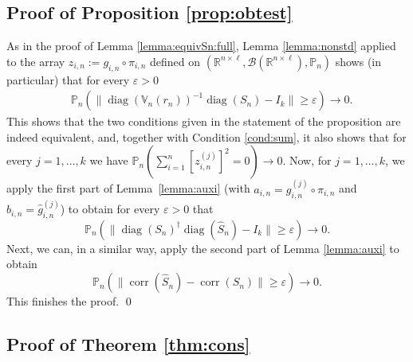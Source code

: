\documentclass[preprint]{imsart}
\newcommand{\R}{{\mathbb R}}
\newcommand{\eps}{\varepsilon}
\DeclareMathOperator{\diag}{diag}
\DeclareMathOperator{\corr}{corr}
\numberwithin{equation}{section}
\begin{document}
\subsection{Proof of Proposition \ref{prop:obtest}}

As in the proof of Lemma \ref{lemma:equivSn:full}, Lemma \ref{lemma:nonstd} applied to the array $z_{i,n} := g_{i,n} \circ \pi_{i,n}$ defined on $(\R^{n \times \ell}, \mathcal{B}(\R^{n \times \ell}), \mathbb{P}_n)$ shows (in particular) that for every $\eps > 0$ 
%
\begin{align}
&\mathbb{P}_n \left( \|\diag(\mathbb{V}_n(r_n))^{-1} \diag(S_n)  - I_k\| \geq \varepsilon \right) \to 0.
\end{align}
%
This shows that the two conditions given in the statement of the proposition are indeed equivalent, and, together with Condition \ref{cond:sum}, it also shows that for every $j = 1, \hdots, k$ we have $\mathbb{P}_n(\sum_{i = 1}^n [z^{(j)}_{i,n}]^2 = 0 ) \to 0$. Now, for $j = 1, \hdots, k$, we apply the first part of Lemma~\ref{lemma:auxi} (with $a_{i,n} = g^{(j)}_{i,n} \circ \pi_{i,n}$ and $b_{i,n} = \hat{g}^{(j)}_{i,n}$) to obtain for every $\eps > 0$ that
%
\begin{equation}
\mathbb{P}_n \left( \|\diag(S_n)^{\dagger} \diag(\hat{S}_n)  - I_k\| \geq \varepsilon \right) \to 0.
\end{equation}
%
Next, we can, in a similar way, apply the second part of Lemma \ref{lemma:auxi} to obtain
%
\begin{equation}
\mathbb{P}_n \left( \|\corr \left( \hat{S}_n \right) - \corr \left(  S_n \right)\| \geq \varepsilon \right) \to 0.
\end{equation}
This finishes the proof. \hfill\qed



\subsection{Proof of Theorem \ref{thm:cons}}
\end{document}
